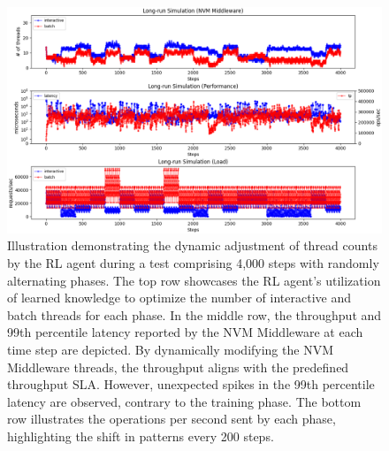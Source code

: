 \label{appendix:e}

\begin{figure}[ht]
  \centering
  \includegraphics[width=\textwidth,height=\textheight,keepaspectratio]{images/long_run_sim.png}
  \caption[Reinforcement Learning Agent Adaptation to Shifting Workloads]{Illustration demonstrating the dynamic adjustment of thread counts by the RL agent during a test comprising 4,000 steps with randomly alternating phases. The top row showcases the RL agent's utilization of learned knowledge to optimize the number of interactive and batch threads for each phase. In the middle row, the throughput and 99th percentile latency reported by the NVM Middleware at each time step are depicted. By dynamically modifying the NVM Middleware threads, the throughput aligns with the predefined throughput SLA. However, unexpected spikes in the 99th percentile latency are observed, contrary to the training phase. The bottom row illustrates the operations per second sent by each phase, highlighting the shift in patterns every 200 steps.}
  \label{fig:long_run_eval}
\end{figure}

